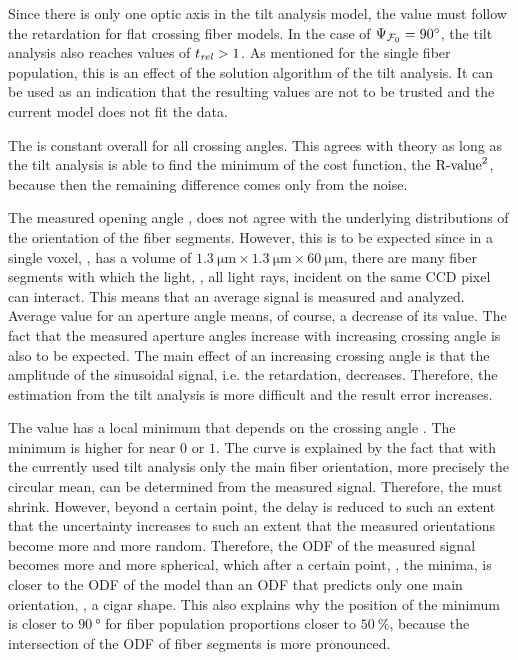 Since there is only one optic axis in the tilt analysis model, the \trel{} value must follow the retardation for flat crossing fiber models.
In the case of $\textnormal{$\Psi_{\textnormal{$\mathcal{F}_0$}}$}=\SI{90}{\degree}$, the tilt analysis also reaches values of $\textnormal{$t_\mathit{rel}$}>1$.
As mentioned for the single fiber population, this is an effect of the solution algorithm of the tilt analysis.
It can be used as an indication that the resulting values are not to be trusted and the current model does not fit the data.
\par
%
The \rvalue{} is constant overall for all crossing angles.
This agrees with theory as long as the tilt analysis is able to find the minimum of the cost function, the $\textnormal{R-value}^2$, because then the remaining difference comes only from the noise.
\par
%
The measured opening angle \openingAngle{}, does not agree with the underlying distributions of the orientation of the fiber segments.
However, this is to be expected since in a single voxel, \ie{}, has a volume of $\SI{1.3}{\micro\meter} \times \SI{1.3}{\micro\meter} \times \SI{60}{\micro\meter}$, there are many fiber segments with which the light, \ie{}, all light rays, incident on the same \ac{CCD} pixel can interact.
This means that an average signal is measured and analyzed.
Average value for an aperture angle means, of course, a decrease of its value.
The fact that the measured aperture angles increase with increasing crossing angle is also to be expected.
The main effect of an increasing crossing angle is that the amplitude of the sinusoidal signal, i.e. the retardation, decreases.
Therefore, the estimation from the tilt analysis is more difficult and the result error increases.
%
\par
The \accvalue{} value has a local minimum that depends on the crossing angle \modelOmega{}.
The minimum is higher for \modelPsi{} near $0$ or $1$.
The curve is explained by the fact that with the currently used tilt analysis only the main fiber orientation, more precisely the circular mean, can be determined from the measured signal.
Therefore, the \accvalue{} must shrink.
However, beyond a certain point, the delay is reduced to such an extent that the uncertainty increases to such an extent that the measured orientations become more and more random.
Therefore, the \ac{ODF} of the measured signal becomes more and more spherical, which after a certain point, \ie{}, the minima, is closer to the \ac{ODF} of the model than an \ac{ODF} that predicts only one main orientation, \ie{}, a cigar shape.
This also explains why the position of the minimum is closer to $\SI{90}{\degree}$ for fiber population proportions closer to $\SI{50}{\percent}$, because the intersection of the \ac{ODF} of fiber segments is more pronounced.
%
%
%
